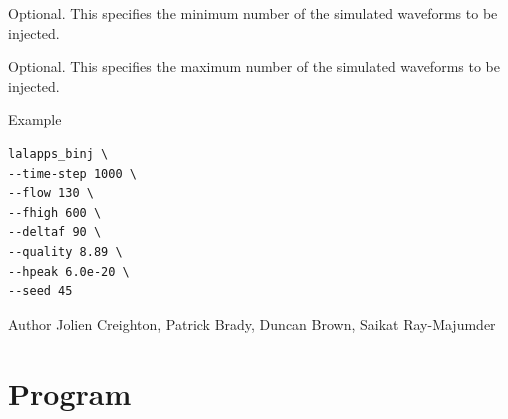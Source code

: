 \begin{entry}
\begin{entry}
\item[\option{--simwaveform-min-number} \parm{simwaveform-min-number}] 
Optional.  This specifies the minimum number of the simulated waveforms to be injected.

\item[\option{--simwaveform-max-number} \parm{simwaveform-max-number}] 
Optional.  This specifies the maximum number of the simulated waveforms to be injected.  
\end{entry}

\item[Example]
\begin{verbatim}
lalapps_binj \
--time-step 1000 \
--flow 130 \
--fhigh 600 \
--deltaf 90 \
--quality 8.89 \
--hpeak 6.0e-20 \
--seed 45
\end{verbatim}

\item[Author] 
Jolien Creighton, Patrick Brady, Duncan Brown, Saikat Ray-Majumder
\end{entry}
\clearpage


\section{Program }
\label{program:lalapps-binj-find}

